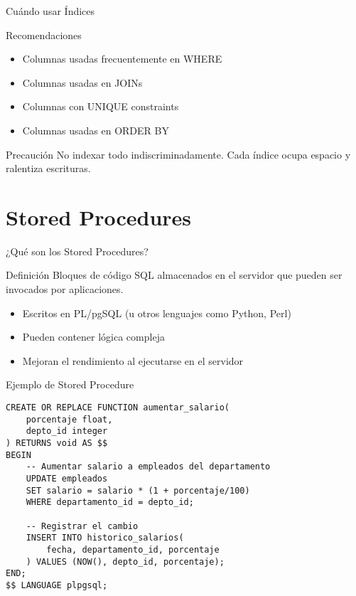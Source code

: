 \documentclass{beamer}
\begin{document}
\begin{frame}{Cuándo usar Índices}
\begin{block}{Recomendaciones}
\begin{itemize}
\item Columnas usadas frecuentemente en WHERE
\item Columnas usadas en JOINs
\item Columnas con UNIQUE constraints
\item Columnas usadas en ORDER BY
\end{itemize}
\end{block}

\begin{alertblock}{Precaución}
No indexar todo indiscriminadamente. Cada índice ocupa espacio y ralentiza escrituras.
\end{alertblock}
\end{frame}

\section{Stored Procedures}
\begin{frame}{¿Qué son los Stored Procedures?}
\begin{block}{Definición}
Bloques de código SQL almacenados en el servidor que pueden ser invocados por aplicaciones.
\end{block}

\begin{itemize}
\item Escritos en PL/pgSQL (u otros lenguajes como Python, Perl)
\item Pueden contener lógica compleja
\item Mejoran el rendimiento al ejecutarse en el servidor
\end{itemize}
\end{frame}

\begin{frame}[fragile]{Ejemplo de Stored Procedure}
\begin{lstlisting}
CREATE OR REPLACE FUNCTION aumentar_salario(
    porcentaje float,
    depto_id integer
) RETURNS void AS $$
BEGIN
    -- Aumentar salario a empleados del departamento
    UPDATE empleados
    SET salario = salario * (1 + porcentaje/100)
    WHERE departamento_id = depto_id;
    
    -- Registrar el cambio
    INSERT INTO historico_salarios(
        fecha, departamento_id, porcentaje
    ) VALUES (NOW(), depto_id, porcentaje);
END;
$$ LANGUAGE plpgsql;
\end{lstlisting}
\end{frame}
\end{document}
